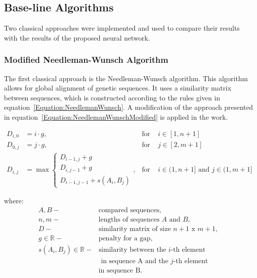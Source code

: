 \documentclass[biomedinformatics,article,submit,moreauthors]{Definitions/mdpi}
\begin{document}
        \subsection{Base-line Algorithms}

        Two classical approaches were implemented and used to compare their results
        with the results of the proposed neural network.

            \subsubsection{Modified Needleman-Wunsch Algorithm}
                The first classical approach is the Needleman-Wunsch algorithm. This algorithm allows for global alignment of genetic sequences. It uses a similarity matrix between sequences, which is constructed according to the rules given in equation~\eqref{Equation:NeedlemanWunsch}. A modification of the approach presented in equation~\eqref{Equation:NeedlemanWunschModified} is applied in the work.

                \begin{equation}
                    \begin{aligned}
                        D_{i,0} &= i \cdot g, & \text{for } & i \in [1, n + 1] \\
                        D_{0,j} &= j \cdot g, & \text{for } & j \in [2, m + 1] \\
                        D_{i,j} &= \max
                        \begin{cases}
                            D_{i - 1, j} + g \\
                            D_{i, j - 1} + g \\
                            D_{i - 1, j - 1} + s(A_i, B_j)
                        \end{cases}, & \text{for } & i \in (1, n + 1] \text{ and } j \in (1, m + 1]
                    \end{aligned}
                    \label{Equation:NeedlemanWunsch}
                \end{equation}

                where:
                \begin{align*}
                    A, B -& \text{compared sequences}, \\
                    n, m -& \text{lengths of sequences } A \text{ and } B, \\
                    D -& \text{similarity matrix of size } n + 1 \text{ x } m + 1, \\
                    g \in \mathbb{R} -& \text{penalty for a gap}, \\
                    s(A_i, B_j) \in \mathbb{R} -& \text{similarity between the } i\text{-th element} \\
                                                & \text{ in sequence A and the } j\text{-th element} \\
                                                & \text{in sequence B}.
                \end{align*}
\end{document}
